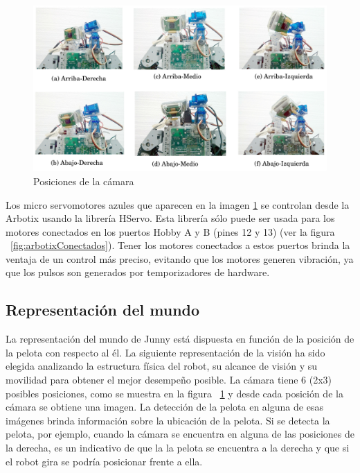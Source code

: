 \begin{figure}[hbtp]
\centering
\includegraphics[scale=0.14]{imagenes/posicionesCamara.jpg}
\caption{Posiciones de la cámara }
\label{posicionesCam}
\end{figure}

Los micro servomotores azules que aparecen en la imagen \ref{posicionesCam} se controlan desde la Arbotix usando la librería HServo. Esta librería s\'olo puede ser usada para los motores conectados en los puertos Hobby A y B (pines 12 y 13) (ver la figura ~\ref{fig:arbotixConectados}). Tener los motores conectados a estos puertos brinda la ventaja de un control más preciso, evitando que los motores generen vibración, ya que los pulsos son generados por temporizadores de hardware. 

\subsection{Representaci\'on del mundo}\label{mundo}

La representación del mundo de Junny está dispuesta en función de la posición de la pelota con respecto al él. 
La siguiente representaci\'on de la visi\'on ha sido elegida analizando la estructura f\'isica del robot, su alcance de visi\'on y su movilidad para obtener el mejor desempeño posible.
La cámara tiene 6 (2x3) posibles posiciones, como se muestra en la figura ~\ref{posicionesCam} y desde cada posición de la cámara se obtiene una imagen. La detección de la pelota en alguna de esas im\'agenes brinda información sobre la ubicación de la pelota. Si se detecta la pelota, por ejemplo, cuando la cámara se encuentra en alguna de las posiciones de la derecha, es un indicativo de que la la pelota se encuentra a la derecha y que si el robot gira se podría posicionar frente a ella. 

